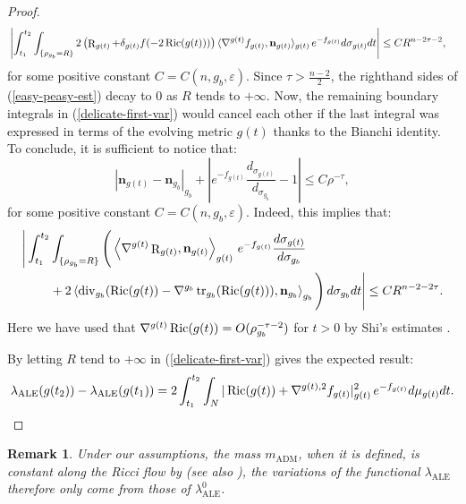 \documentclass[a4paper,11pt,reqno]{amsart}
\newtheorem{rk}[defn]{Remark}
\def\Ric{\mathop{\rm Ric}\nolimits}
\def\tr{\mathop{\rm tr}\nolimits}
\def\div{\mathop{\rm div}\nolimits}
\def\Ric{\mathop{\rm Ric}\nolimits}
\def\tr{\mathop{\rm tr}\nolimits}
\def\div{\mathop{\rm div}\nolimits}
\def\R{\mathop{\rm R}\nolimits}
\numberwithin{equation}{section}
\begin{document}
\begin{proof}
\begin{equation}
\begin{split}
&\left|\int_{t_1}^{t_2}\int_{\{\rho_{g_b}= R\}}2\left(\R_{g(t)}+\delta_{g(t)}f(-2\Ric(g(t)))\right)\langle\nabla^{g(t)}f_{g(t)},\mathbf{n}_{g(t)}\rangle_{g(t)}\,e^{-f_{g(t)}}d\sigma_{g(t)}dt\right|\leq CR^{n-2\tau-2},
\end{split}
\end{equation}
for some positive constant $C=C(n,g_b,\varepsilon)$. Since $\tau>\frac{n-2}{2}$, the righthand sides of (\ref{easy-peasy-est}) decay to $0$ as $R$ tends to $+\infty$. Now, the remaining boundary integrals in (\ref{delicate-first-var}) would cancel each other if the last integral was expressed in terms of the evolving metric $g(t)$ thanks to the Bianchi identity. To conclude, it is sufficient to notice that: 
\begin{equation*}
|\mathbf{n}_{g(t)}-\mathbf{n}_{g_b}|_{g_b}+\left|e^{-f_{g(t)}}\frac{d_{\sigma_{g(t)}}}{d_{\sigma_{g_b}}}-1\right|\leq C\rho^{-\tau},
\end{equation*}
for some positive constant $C=C(n,g_b,\varepsilon)$. Indeed, this implies that:
\begin{equation*}
\begin{split}
\Bigg\lvert\int_{t_1}^{t_2}&\int_{\{\rho_{g_b}=R\}}\Bigg(\left<\nabla^{g(t)}\R_{g(t)},\mathbf{n}_{g(t)}\right>_{g(t)}\,e^{-f_{g(t)}}\frac{d\sigma_{g(t)}}{d\sigma_{g_b}}\\
&+2\left<\div_{g_b}(\Ric(g(t))-\nabla^{g_b}\tr_{g_b}(\Ric(g(t))),\mathbf{n}_{g_b}\right>_{g_b}\Bigg)\,d\sigma_{g_b}dt\Bigg\rvert\leq CR^{n-2-2\tau}.
\end{split}
\end{equation*}
Here we have used that $\nabla^{g(t)}\Ric(g(t))=O(\rho_{g_b}^{-\tau-2})$ for $t>0$ by Shi's estimates \cite{Shi-Def}.

By letting $R$ tend to $+\infty$ in (\ref{delicate-first-var}) gives the expected result:
\begin{equation*}
\lambda_{\operatorname{ALE}}(g(t_2))-\lambda_{\operatorname{ALE}}(g(t_1))=2\int_{t_1}^{t_2}\int_{N}|\Ric(g(t))+\nabla^{g(t),2}f_{g(t)}|^2_{g(t)}\,e^{-f_{g(t)}}d\mu_{g(t)}dt.
\end{equation*}

	\end{proof}
	\begin{rk}
		Under our assumptions, the mass $m_{\operatorname{ADM}}$, when it is defined, is constant along the Ricci flow by \cite{Dai-Ma-Mass} (see also \cite{Li-Yu-ALE}), the variations of the functional $\lambda_{\operatorname{ALE}}$ therefore only come from those of $\lambda_{\operatorname{ALE}}^0$.
	\end{rk}
\end{document}
